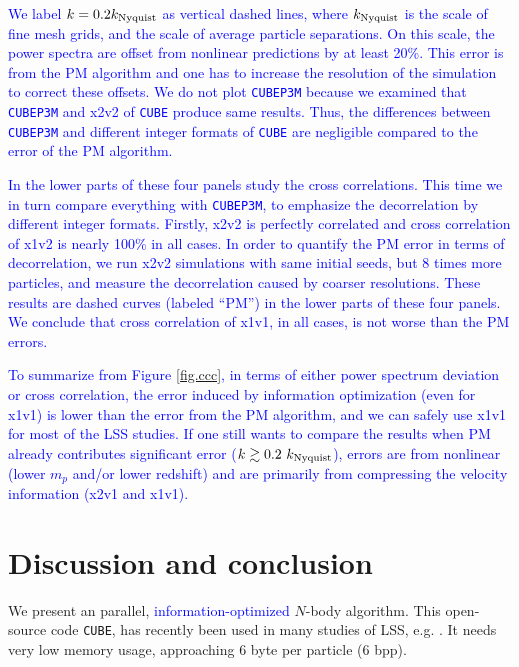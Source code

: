 \documentclass[10pt,twocolumn,preprint]{emulateapj}
\newcommand{\tcb}{\textcolor{blue}}
\begin{document}
\tcb{We label $k=0.2k_{\rm Nyquist}$ as vertical dashed lines, where $k_{\rm Nyquist}$ is the scale of fine mesh grids, and the scale of average particle separations. On this scale, the power spectra are offset from nonlinear predictions by at least 20\%. This error is from the PM algorithm and one has to increase the resolution of the simulation to correct these offsets. We do not plot {\tt CUBEP3M} because we examined that {\tt CUBEP3M} and x2v2 of {\tt CUBE} produce same results. Thus, the differences between {\tt CUBEP3M} and different integer formats of {\tt CUBE} are negligible compared to the error of the PM algorithm.}

\tcb{In the lower parts of these four panels study the cross correlations. This time we in turn compare everything with {\tt CUBEP3M}, to emphasize the decorrelation by different integer formats. Firstly, x2v2 is perfectly correlated and cross correlation of x1v2 is nearly 100\% in all cases. In order to quantify the PM error in terms of decorrelation, we run x2v2 simulations with same initial seeds, but 8 times more particles, and measure the decorrelation caused by coarser resolutions. These results are dashed curves (labeled ``PM'') in the lower parts of these four panels. We conclude that cross correlation of x1v1, in all cases, is not worse than the PM errors.}

\tcb{To summarize from Figure \ref{fig.ccc}, in terms of either power spectrum deviation or cross correlation, the error induced by information optimization (even for x1v1) is lower than the error from the PM algorithm, and we can safely use x1v1 for most of the LSS studies. If one still wants to compare the results when PM already contributes significant error ($k\gtrsim 0.2\ k_{\rm Nyquist}$), errors are from nonlinear (lower $m_p$ and/or lower redshift) and are primarily from compressing the velocity information (x2v1 and x1v1).}


\section{Discussion and conclusion}\label{s.discussion}
We present an parallel, \tcb{information-optimized} $N$-body algorithm. This open-source code {\tt CUBE}, has recently been used in many studies of LSS, e.g. \cite{2017PhRvD..95d3501Y,2017ApJ...841L..29W,2017MNRAS.469.1968P}. It needs very low memory usage, approaching 6 byte per particle (6 bpp).
\end{document}
